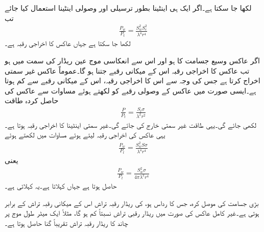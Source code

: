 لکھا جا سکتا ہے۔اگر ایک ہی اینٹینا بطور ترسیلی اور وصولی اینٹینا استعمال کیا جائے تب
\begin{align}\label{مساوات_اینٹینا_فرائس_الف}
\frac{P_w}{P_t}=\frac{S_w^2 S_e^2}{\lambda^4 r^4}
\end{align}
لکھا جا سکتا ہے جہاں عاکس کا اخراجی رقبہ  ہے۔

اگر عاکس وسیع جسامت کا ہو اور اس سے انعکاسی موج عین ریڈار کی سمت میں ہو تب عاکس کا اخراجی رقبہ اس کے میکانی رقبے جتنا ہو گا۔عموماً عاکس غیر سمتی اخراج کرتا ہے جس کی وجہ سے اس کا اخراجی رقبہ، اس کے میکانی رقبے سے کم ہوتا ہے۔ایسی صورت میں عاکس کے وصولی رقبے کو  لکھتے ہوئے مساوات  سے عاکس کی حاصل کردہ طاقت
\begin{align}
\frac{P}{P_t}=\frac{S_t \sigma}{\lambda^2 r^2}
\end{align}
لکھی جائے گی۔یہی طاقت غیر سمتی خارج کی جائے گی۔غیر سمتی اینٹینا کا اخراجی رقبہ  ہوتا ہے۔یہی عاکس کی اخراجی رقبہ لیتے ہوئے مساوات  میں  لکھتے ہوئے
\begin{align}
\frac{P_w}{P_t}=\frac{S_w^2 S \sigma}{\lambda^4 r^4}
\end{align}
یعنی
\begin{align}
\frac{P_w}{P_t}=\frac{S_w^2 \sigma}{4\pi \lambda^2 r^4}
\end{align}
حاصل ہوتا ہے جہاں   کہلاتا ہے۔یہ  کہلاتی ہے۔  

بڑی جسامت کی موصل کرہ، جس کا رداس  ہو،  کی ریڈار رقبہ تراش اس کے میکانی رقبہ تراش  کے برابر ہوتی ہے۔غیر کامل عاکس کی صورت میں ریڈار رقبی تراش نسبتاً کم ہو گا، مثلاً ایک میٹر طول موج پر چاند کا ریڈار رقبہ تراش تقریباً  گنا حاصل ہوتا ہے۔ 

